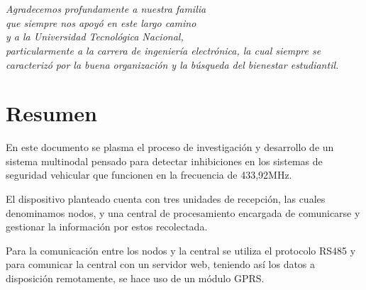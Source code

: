 \documentclass[12pt]{report}
\begin{document}

\chapter*{}
\begin{flushright}
\textit{Agradecemos profundamente a nuestra familia \\
que siempre nos apoyó en este largo camino \\
y a la Universidad Tecnológica Nacional, \\
particularmente a la carrera de ingeniería electrónica,
la cual siempre se caracterizó por la buena organización y la búsqueda del bienestar estudiantil.}
\end{flushright}

\chapter*{Resumen} %

En este documento se plasma el proceso de investigación y desarrollo de un sistema multinodal pensado para detectar 
inhibiciones en los sistemas de seguridad vehicular que funcionen en la frecuencia de 433,92MHz.\par
El dispositivo planteado cuenta con tres unidades de recepción, las cuales denominamos nodos, y una central de procesamiento
encargada de comunicarse y gestionar la información por estos recolectada. \par
Para la comunicación entre los nodos y la central se utiliza el protocolo RS485 
y para comunicar la central con un servidor web, teniendo así los datos a disposición remotamente, se hace uso de un módulo GPRS.


\tableofcontents %

\cleardoublepage
\listoffigures %

\cleardoublepage


\pagebreak

\pagebreak


\pagebreak

\pagebreak


\pagebreak

\pagebreak

\pagebreak
\end{document}
